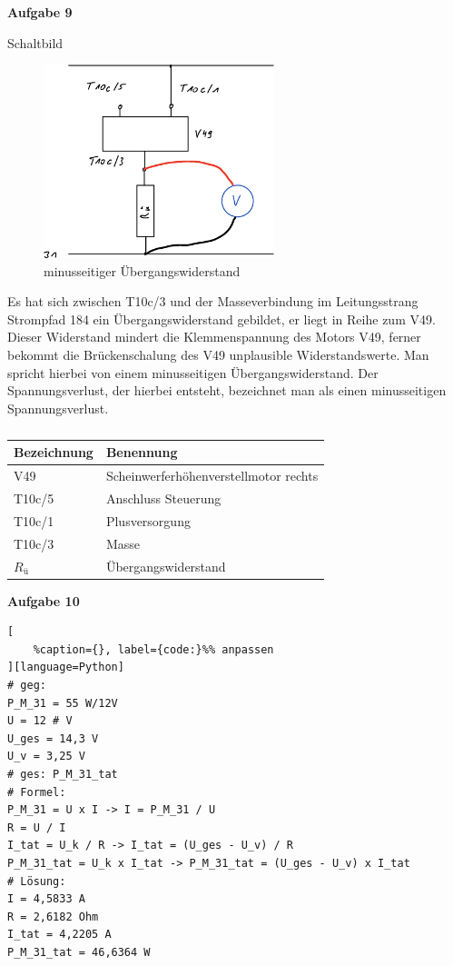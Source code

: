 \newpage

\textbf{Aufgabe 9}

Schaltbild

\begin{figure}[!ht]%
\centering
\includegraphics[width=0.6\textwidth]{images/Skizze/29_FT_minusseitiger_Ubergangswiderstand.pdf}
\caption{minusseitiger Übergangswiderstand}
\end{figure}

Es hat sich zwischen T10c/3 und der Masseverbindung im Leitungsstrang
Strompfad 184 ein Übergangswiderstand gebildet, er liegt in Reihe zum
V49. Dieser Widerstand mindert die Klemmenspannung des Motors V49,
ferner bekommt die Brückenschalung des V49 unplausible Widerstandswerte.
Man spricht hierbei von einem minusseitigen Übergangswiderstand. Der
Spannungsverlust, der hierbei entsteht, bezeichnet man als einen
minusseitigen Spannungsverlust.

\begin{table}[!ht]%
\centering 
	\caption{}%
\begin{tabular}{@{}ll@{}}
\hline
\textbf{Bezeichnung} & \textbf{Benennung} \\
\hline
V49 & Scheinwerferhöhenverstellmotor rechts \\
T10c/5 & Anschluss Steuerung \\
T10c/1 & Plusversorgung \\
T10c/3 & Masse \\
$R_\text{ü}$ & Übergangswiderstand \\
\hline
\end{tabular} 
\end{table}

\newpage

\textbf{Aufgabe 10}

\lstset{language=Python}%
\begin{lstlisting}[
	%caption={}, label={code:}%% anpassen
][language=Python]
# geg:
P_M_31 = 55 W/12V
U = 12 # V
U_ges = 14,3 V
U_v = 3,25 V
# ges: P_M_31_tat
# Formel:
P_M_31 = U x I -> I = P_M_31 / U
R = U / I
I_tat = U_k / R -> I_tat = (U_ges - U_v) / R
P_M_31_tat = U_k x I_tat -> P_M_31_tat = (U_ges - U_v) x I_tat
# Lösung:
I = 4,5833 A
R = 2,6182 Ohm
I_tat = 4,2205 A
P_M_31_tat = 46,6364 W
\end{lstlisting}


